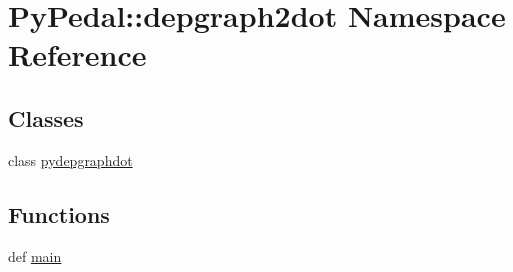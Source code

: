 \hypertarget{namespacePyPedal_1_1depgraph2dot}{
\section{PyPedal::depgraph2dot Namespace Reference}
\label{namespacePyPedal_1_1depgraph2dot}
}


\subsection*{Classes}
\begin{CompactItemize}
\item 
class \hyperlink{classPyPedal_1_1depgraph2dot_1_1pydepgraphdot}{pydepgraphdot}
\end{CompactItemize}
\subsection*{Functions}
\begin{CompactItemize}
\item 
\hypertarget{namespacePyPedal_1_1depgraph2dot_d1e8325ef691b054a2e07582c932e29e}{
def \hyperlink{namespacePyPedal_1_1depgraph2dot_d1e8325ef691b054a2e07582c932e29e}{main}}
\label{namespacePyPedal_1_1depgraph2dot_d1e8325ef691b054a2e07582c932e29e}

\end{CompactItemize}
